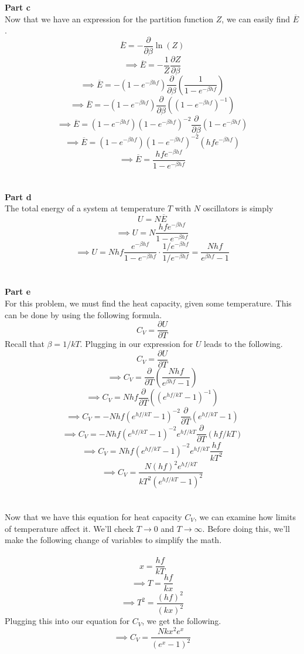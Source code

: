 \documentclass[12pt]{article}
\newcommand{\partDeriv}[2]{\frac{\partial #1}{\partial #2}}
\begin{document}
\begin{flushleft}
\textbf{Part c}\\
Now that we have an expression for the partition function $Z$, we can easily find $\overline{E}$.
$$\overline{E}=-\partDeriv{}{\beta}\ln(Z)$$
$$\implies\overline{E}=-\frac{1}{Z}\partDeriv{Z}{\beta}$$
$$\implies\overline{E}=-(1-e^{-\beta hf})\partDeriv{}{\beta}(\frac{1}{1-e^{-\beta hf}})$$
$$\implies\overline{E}=-(1-e^{-\beta hf})\partDeriv{}{\beta}((1-e^{-\beta hf})^{-1})$$
$$\implies\overline{E}=(1-e^{-\beta hf})(1-e^{-\beta hf})^{-2}\partDeriv{}{\beta}(1-e^{-\beta hf})$$
$$\implies\overline{E}=(1-e^{-\beta hf})(1-e^{-\beta hf})^{-2}(hfe^{-\beta hf})$$
$$\implies\overline{E}=\frac{hfe^{-\beta hf}}{1-e^{-\beta hf}}$$\\~\\


\textbf{Part d}\\
The total energy of a system at temperature $T$ with $N$ oscillators is simply
$$U=N\overline{E}$$
$$\implies U=N\frac{hfe^{-\beta hf}}{1-e^{-\beta hf}}$$
$$\implies U=Nhf\frac{e^{-\beta hf}}{1-e^{-\beta hf}}\cdot\frac{1/e^{-\beta hf}}{1/e^{-\beta hf}}=\frac{Nhf}{e^{\beta hf}-1}$$\\~\\


\textbf{Part e}\\
For this problem, we must find the heat capacity, given some temperature.
This can be done by using the following formula.
\begin{equation}
    C_V=\partDeriv{U}{T}
\end{equation}
Recall that $\beta=1/kT$.
Plugging in our expression for $U$ leads to the following.
$$C_V=\partDeriv{U}{T}$$
$$\implies C_V=\partDeriv{}{T}(\frac{Nhf}{e^{\beta hf}-1})$$
$$\implies C_V=Nhf\partDeriv{}{T}((e^{hf/kT}-1)^{-1})$$
$$\implies C_V=-Nhf(e^{hf/kT}-1)^{-2}\partDeriv{}{T}(e^{hf/kT}-1)$$
$$\implies C_V=-Nhf(e^{hf/kT}-1)^{-2}e^{hf/kT}\partDeriv{}{T}(hf/kT)$$
$$\implies C_V=Nhf(e^{hf/kT}-1)^{-2}e^{hf/kT}\frac{hf}{kT^2}$$
$$\implies C_V=\frac{N(hf)^2e^{hf/kT}}{kT^2(e^{hf/kT}-1)^2}$$\\~\\

Now that we have this equation for heat capacity $C_V$, we can examine how limits of temperature affect it. We'll check $T\rightarrow0$ and $T\rightarrow\infty$. Before doing this, we'll make the following change of variables to simplify the math.\\~\\

$$x=\frac{hf}{kT}$$
$$\implies T=\frac{hf}{kx}$$
$$\implies T^2=\frac{(hf)^2}{(kx)^2}$$
Plugging this into our equation for $C_V$, we get the following.
$$\implies C_V=\frac{Nkx^2e^x}{(e^x-1)^2}$$\\~\\


\end{flushleft}
\end{document}

